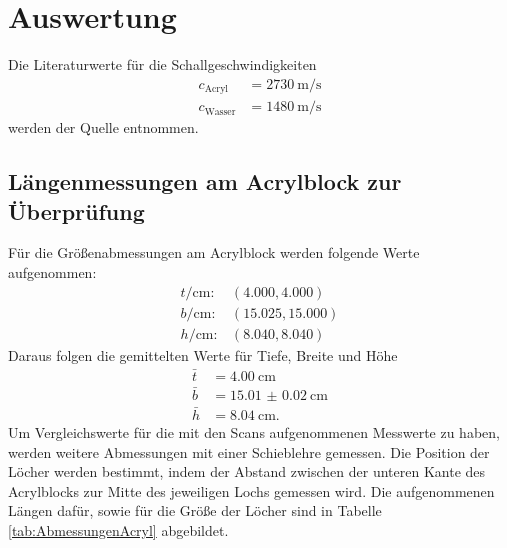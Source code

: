 \section{Auswertung}
\label{sec:Auswertung}

Die Literaturwerte für die Schallgeschwindigkeiten
\begin{align}
  c_\text{Acryl} & = \SI{2730}{\meter\per\second} \\
  c_\text{Wasser} & = \SI{1480}{\meter\per\second}
\end{align}
werden der Quelle \cite{schall} entnommen.

\subsection{Längenmessungen am Acrylblock zur Überprüfung}

Für die Größenabmessungen am Acrylblock werden folgende Werte aufgenommen:
\begin{align}
  t/\si{\centi\meter}: & (4.000 , 4.000) \\
  b/\si{\centi\meter}: & (15.025 , 15.000) \\
  h/\si{\centi\meter}: & (8.040, 8.040)
\end{align}
Daraus folgen die gemittelten Werte für Tiefe, Breite und Höhe
\begin{align}
  \bar{t} & = \SI{4.00}{\centi\meter} \\
  \bar{b} & = \SI{15.01(2)}{\centi\meter} \\
  \bar{h} & = \SI{8.04}{\centi\meter}.
  \label{eqn:AbmessungenAcryl}
\end{align}
Um Vergleichswerte für die mit den Scans aufgenommenen Messwerte zu haben,
werden weitere Abmessungen mit einer Schieblehre gemessen.
Die Position der Löcher werden bestimmt, indem der Abstand zwischen der
unteren Kante des Acrylblocks zur Mitte des jeweiligen Lochs gemessen wird.
Die aufgenommenen Längen dafür, sowie für die Größe der Löcher sind in
Tabelle \ref{tab:AbmessungenAcryl} abgebildet.


